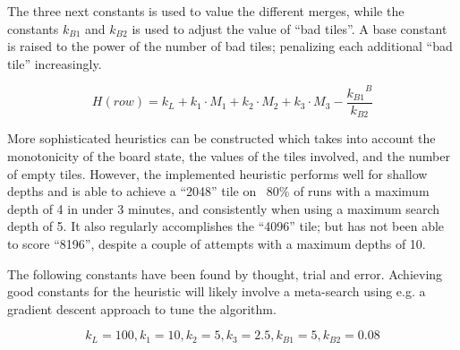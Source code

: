 The three next constants is used to value the different merges, while the constants $k_{B1}$ and $k_{B2}$ is used to adjust the value of ``bad tiles''. A base constant is raised to the power of the number of bad tiles; penalizing each additional ``bad tile'' increasingly.

\begin{displaymath}
H(\textit{row}) = k_L + k_1 \cdot M_1 + k_2 \cdot M_2 + k_3 \cdot M_3 - \frac{{k_{B1}}^{B}}{k_{B2}}
\end{displaymath}

More sophisticated heuristics can be constructed which takes into account the monotonicity of the board state, the values of the tiles involved, and the number of empty tiles. However, the implemented heuristic performs well for shallow depths and is able to achieve a ``2048'' tile on ~80\% of runs with a maximum depth of 4 in under 3 minutes, and consistently when using a maximum search depth of 5. It also regularly accomplishes the ``4096'' tile; but has not been able to score ``8196'', despite a couple of attempts with a maximum depths of 10.

The following constants have been found by thought, trial and error. Achieving good constants for the heuristic will likely involve a meta-search using e.g. a gradient descent approach to tune the algorithm.

\begin{displaymath}
k_L = 100, k_1 = 10, k_2 = 5, k_3 = 2.5, k_{B1} = 5, k_{B2} = 0.08
\end{displaymath}



